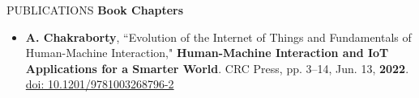 \documentclass{resume} %
\begin{document}
\begin{rSection}{PUBLICATIONS}
    \textbf{Book Chapters}
        \begin{itemize}
            \itemsep -3pt {} 
            \item \textbf{A. Chakraborty}, ``Evolution of the Internet of Things and Fundamentals of Human-Machine Interaction," \textbf{Human-Machine Interaction and IoT Applications for a Smarter World}. CRC Press, pp. 3–14, Jun. 13, \textbf{2022}. \href{https://www.taylorfrancis.com/chapters/edit/10.1201/9781003268796-2/evolution-internet-things-fundamentals-human-machine-interaction-anirban-chakraborty}{doi: 10.1201/9781003268796-2}
        \end{itemize}
\end{rSection}
\end{document}
